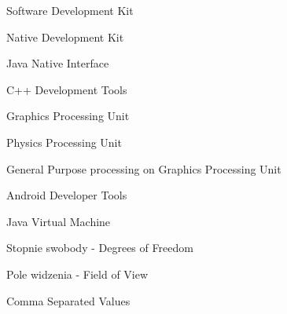 \suppressfloats[t]

\begin{description}[\setleftmargin{65pt}\setlabelstyle{\bfseries}]
    \leftskip=1cm

	\item[$SDK$]      	Software Development Kit
    \item[$NDK$]      	Native Development Kit
    \item[$JNI$]      	Java Native Interface
    \item[$CDT$]        C++ Development Tools
    \item[$GPU$]		Graphics Processing Unit
    \item[$PPU$]        Physics Processing Unit
    \item[$GPGPU$]      General Purpose processing on Graphics Processing Unit
    \item[$ADT$]        Android Developer Tools
    \item[$JVM$]        Java Virtual Machine
    \item[$DoF$]        Stopnie swobody - Degrees of Freedom
    \item[$FoV$]		Pole widzenia - Field of View
    \item[$CSV$]		Comma Separated Values
\end{description}
